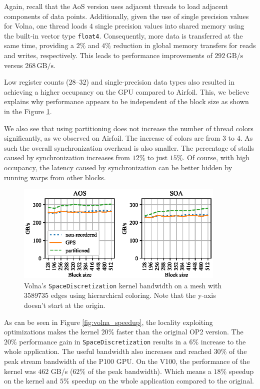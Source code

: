 Again, recall that the AoS version uses adjacent threads to load adjacent 
components of data points. Additionally, given the use of single precision 
values for Volna, one thread loads $4$ single precision values into shared 
memory using the built-in vector type \lstinline!float4!. Consequently, more 
data is transferred at the same time, providing a $2\%$ and $4\%$ reduction
in global memory transfers for reads and writes, respectively. This leads 
to performance improvements of $292\,\text{GB/s}$ versus $268\,\text{GB/s}$.

Low register counts ($28$--$32$) and single-precision data types also 
resulted in achieving a higher occupancy on the GPU compared to Airfoil. This, 
we believe explains why performance appears to be independent of the block size 
as shown in the Figure \ref{fig:volna_bw-vs-bs_hier}. 

We also see that using partitioning does not increase the number of thread 
colors significantly, as we observed on Airfoil. The increase of colors are 
from $3$ to $4$. As such the overall synchronization overhead is also smaller. 
The percentage of stalls caused by synchronization increases from $12\%$ to just 
$15\%$. Of course, with high occupancy, the latency caused by synchronization 
can be better hidden by running warps from other blocks. 


\begin{figure}[Htbp]
  \centering
  \includegraphics[width=10cm]{fig/volna_bw-vs-bs_hier.eps}
  \caption{Volna's \texttt{SpaceDiscretization} kernel bandwidth on a mesh with
  $3589735$ edges using hierarchical coloring. Note that the y-axis doesn't
  start at the origin.}
  \label{fig:volna_bw-vs-bs_hier}
\end{figure}

As can be seen in Figure \ref{fig:volna_speedup}, the locality exploiting 
optimizations makes the kernel $20\%$ faster than the original OP2 version. The 
$20\%$ performance gain in \texttt{SpaceDiscretization} results in a $6\%$ 
increase to the whole application. The useful bandwidth also increases and 
reached $30\%$ of the peak stream bandwidth of the P100 GPU. On the V100, the 
performance of the kernel was $462$ GB/s ($62\%$ of the peak bandwidth). Which 
means a $18\%$ speedup on the kernel and $5\%$ speedup on the whole
application compared to the original.

